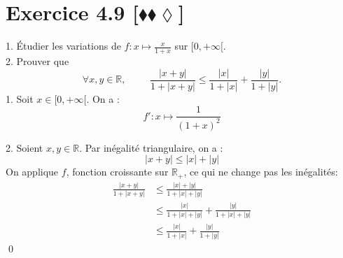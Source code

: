 \documentclass[10pt]{article}
\begin{document}
\section*{Exercice 4.9 [$\blacklozenge\blacklozenge\lozenge$]}
\begin{tcolorbox}[enhanced, width=7in, center, size=fbox, fontupper=\large, drop shadow southwest]
    1. Étudier les variations de $f:x\mapsto\frac{x}{1+x}$ sur $[0,+\infty[$.\\
    2. Prouver que
    \begin{equation*}
        \forall{x,y\in\mathbb{R}}, \hspace{1cm} \frac{|x+y|}{1+|x+y|}\leq\frac{|x|}{1+|x|}+\frac{|y|}{1+|y|}.
    \end{equation*}
    1. Soit $x\in\lbrack0,+\infty\lbrack$. On a :
    \begin{equation*}
        f':x\mapsto\frac{1}{(1+x)^2}
    \end{equation*}
    \begin{center}
    \end{center}
    2. Soient $x,y\in\mathbb{R}$. Par inégalité triangulaire, on a :
    \begin{equation*}
        |x+y|\leq|x|+|y|
    \end{equation*}
    On applique $f$, fonction croissante sur $\mathbb{R}_+$, ce qui ne change pas les inégalités:
    \begin{align*}
        \frac{|x+y|}{1+|x+y|}&\leq\frac{|x|+|y|}{1+|x|+|y|}\\
        &\leq\frac{|x|}{1+|x|+|y|}+\frac{|y|}{1+|x|+|y|}\\
        &\leq\frac{|x|}{1+|x|}+\frac{|y|}{1+|y|}
    \end{align*}
    \qed
\end{tcolorbox}
\end{document}
